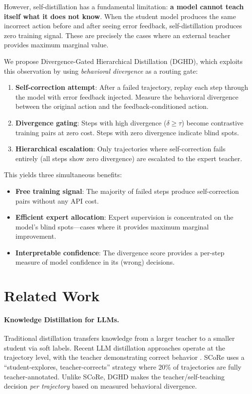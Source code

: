 \documentclass[11pt]{article}
\newcommand{\ours}{DGHD}
\newcommand{\ourslong}{Divergence-Gated Hierarchical Distillation}
\newcommand{\divergence}{\delta}
\newcommand{\threshold}{\tau}
\begin{document}
However, self-distillation has a fundamental limitation: \textbf{a model cannot teach itself what it does not know}. When the student model produces the same incorrect action before and after seeing error feedback, self-distillation produces zero training signal. These are precisely the cases where an external teacher provides maximum marginal value.

We propose \ourslong{} (\ours{}), which exploits this observation by using \emph{behavioral divergence} as a routing gate:

\begin{enumerate}
    \item \textbf{Self-correction attempt}: After a failed trajectory, replay each step through the model with error feedback injected. Measure the behavioral divergence between the original action and the feedback-conditioned action.
    \item \textbf{Divergence gating}: Steps with high divergence ($\divergence \geq \threshold$) become contrastive training pairs at zero cost. Steps with zero divergence indicate blind spots.
    \item \textbf{Hierarchical escalation}: Only trajectories where self-correction fails entirely (all steps show zero divergence) are escalated to the expert teacher.
\end{enumerate}

This yields three simultaneous benefits:
\begin{itemize}
    \item \textbf{Free training signal}: The majority of failed steps produce self-correction pairs without any API cost.
    \item \textbf{Efficient expert allocation}: Expert supervision is concentrated on the model's blind spots---cases where it provides maximum marginal improvement.
    \item \textbf{Interpretable confidence}: The divergence score provides a per-step measure of model confidence in its (wrong) decisions.
\end{itemize}

\section{Related Work}
\label{sec:related}

\paragraph{Knowledge Distillation for LLMs.}
Traditional distillation \citep{hinton2015distilling} transfers knowledge from a larger teacher to a smaller student via soft labels. Recent LLM distillation approaches operate at the trajectory level, with the teacher demonstrating correct behavior \citep{score2025}. SCoRe \citep{score2025} uses a ``student-explores, teacher-corrects'' strategy where 20\% of trajectories are fully teacher-annotated. Unlike SCoRe, \ours{} makes the teacher/self-teaching decision \emph{per trajectory} based on measured behavioral divergence.
\end{document}
